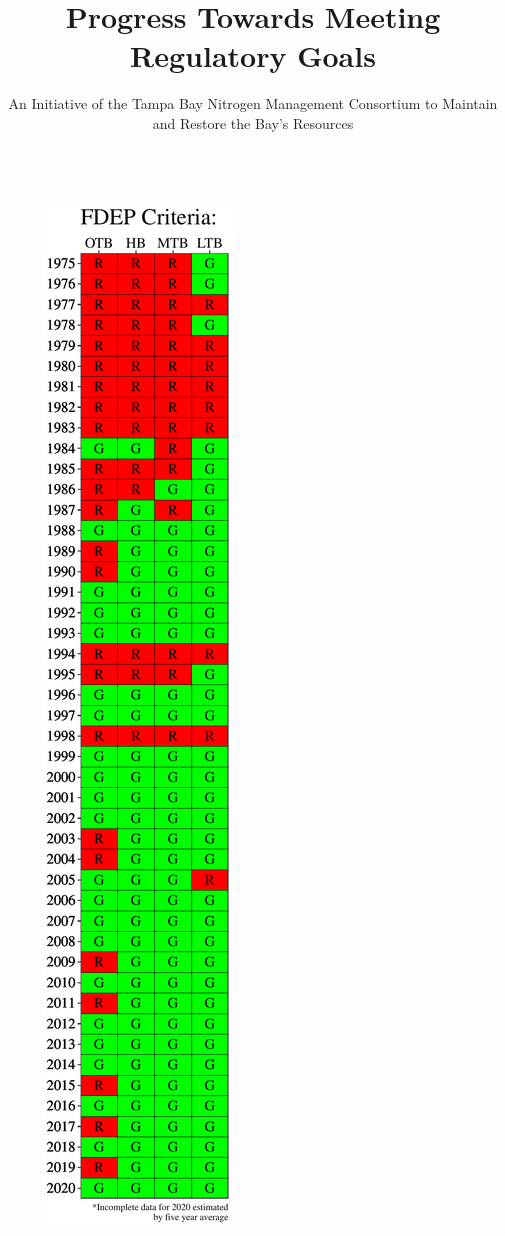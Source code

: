 \documentclass[final,t]{beamer}\usepackage[]{graphicx}\usepackage[]{color}
\title{\Large Progress Towards Meeting Regulatory Goals}
\author{\normalsize An Initiative of the Tampa Bay Nitrogen Management Consortium to Maintain\\ and Restore the Bay's Resources}
\begin{document}
\begin{frame}

\vspace{-0.4cm} %
\begin{columns}[t]

\begin{column}{.2\linewidth}

\vspace{-0.2in}


\begin{figure}
\centerline{\includegraphics[trim = 0cm 0cm 0cm 0cm, width=1.1\linewidth]{figure/chlmat.pdf}}

\end{figure}
\end{column}
\end{columns}
\end{frame}
\end{document}
